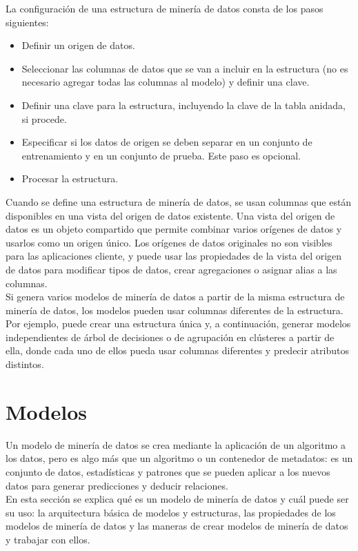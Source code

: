 \documentclass[a4paper, 11pt]{article} %
\begin{document}
La configuración de una estructura de minería de datos consta de los pasos siguientes:

\begin{itemize}
\item Definir un origen de datos.
\item Seleccionar las columnas de datos que se van a incluir en la estructura (no es necesario agregar todas las columnas al modelo) y definir una clave.
\item Definir una clave para la estructura, incluyendo la clave de la tabla anidada, si procede.
\item Especificar si los datos de origen se deben separar en un conjunto de entrenamiento y en un conjunto de prueba. Este paso es opcional.
\item Procesar la estructura.
\end{itemize}

Cuando se define una estructura de minería de datos, se usan columnas que están disponibles en una vista del origen de datos existente. Una vista del origen de datos es un objeto compartido que permite combinar varios orígenes de datos y usarlos como un origen único. Los orígenes de datos originales no son visibles para las aplicaciones cliente, y puede usar las propiedades de la vista del origen de datos para modificar tipos de datos, crear agregaciones o asignar alias a las columnas.\\

Si genera varios modelos de minería de datos a partir de la misma estructura de minería de datos, los modelos pueden usar columnas diferentes de la estructura. Por ejemplo, puede crear una estructura única y, a continuación, generar modelos independientes de árbol de decisiones o de agrupación en clústeres a partir de ella, donde cada uno de ellos pueda usar columnas diferentes y predecir atributos distintos.

\section*{Modelos}

Un modelo de minería de datos se crea mediante la aplicación de un algoritmo a los datos, pero es algo más que un algoritmo o un contenedor de metadatos: es un conjunto de datos, estadísticas y patrones que se pueden aplicar a los nuevos datos para generar predicciones y deducir relaciones.\\

En esta sección se explica qué es un modelo de minería de datos y cuál puede ser su uso: la arquitectura básica de modelos y estructuras, las propiedades de los modelos de minería de datos y las maneras de crear modelos de minería de datos y trabajar con ellos.\\
\end{document}
